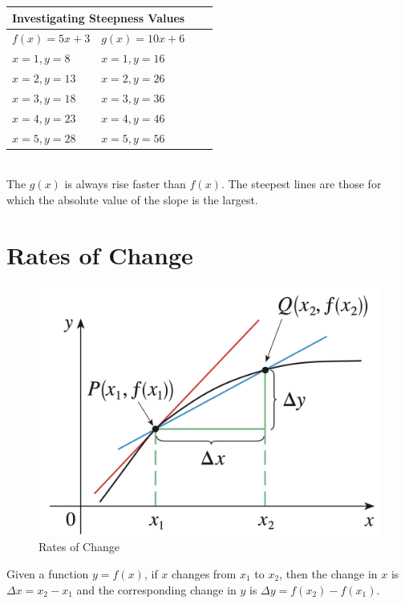 \begin{tabular}{ |p{3cm}||p{3cm}|p{3cm}|p{3cm}|}
 \hline
 \multicolumn{2}{|c|}{Investigating Steepness Values} \\
 \hline
 $f(x) = 5x + 3$ & $g(x) = 10x + 6$\\
 \hline
 $x=1, y=8$  & $x=1, y=16$\\
 $x=2, y=13$ & $x=2, y=26$\\
 $x=3, y=18$ & $x=3, y=36$\\
 $x=4, y=23$ & $x=4, y=46$ \\
 $x=5, y=28$ & $x=5, y=56$\\
 \hline
\end{tabular}
\\
The $g(x)$ is always rise faster than $f(x)$. The steepest lines are those for which the absolute value of the slope is the largest.

\section{Rates of Change}
\begin{figure}[h]
    \centering
    \includegraphics[scale=0.3]{chapter001/figures/fig004}
    \caption{Rates of Change}
    \label{fig:Fig4}
\end{figure}

\begin{flushleft}
Given a function $y=f(x)$, if $x$ changes from $x_1$ to $x_2$, then the change in $x$ is $\Delta x = x_2 - x_1$ and the corresponding change in $y$ is $\Delta y = f(x_2) - f(x_1)$.
\end{flushleft}

